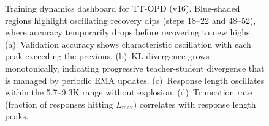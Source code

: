 \begin{figure}[t]
\begin{subfigure}[b]{0.24\textwidth}
\end{subfigure}
\caption{Training dynamics dashboard for TT-OPD (v16). Blue-shaded regions highlight oscillating recovery dips (steps 18--22 and 48--52), where accuracy temporarily drops before recovering to new highs. (a)~Validation accuracy shows characteristic oscillation with each peak exceeding the previous. (b)~KL divergence grows monotonically, indicating progressive teacher-student divergence that is managed by periodic EMA updates. (c)~Response length oscillates within the 5.7--9.3K range without explosion. (d)~Truncation rate (fraction of responses hitting $L_{\max}$) correlates with response length peaks.}
\label{fig:training_dashboard}
\end{figure}


